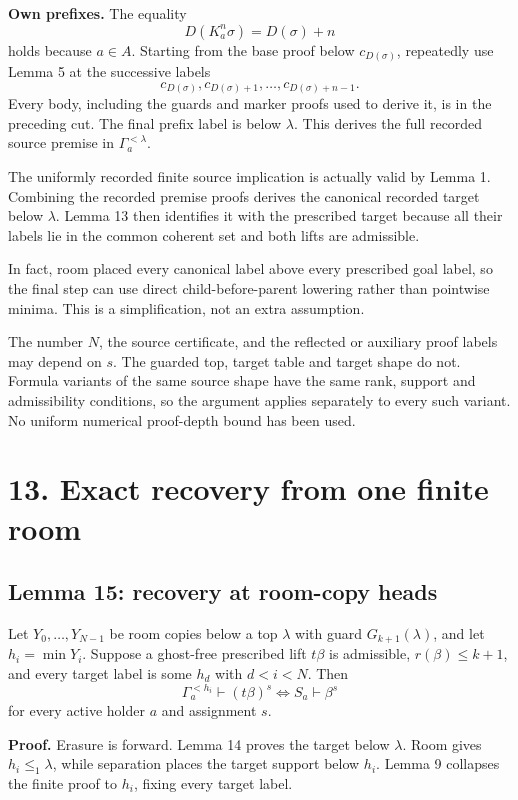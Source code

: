 \documentclass[
  11pt,
  letterpaper,
]{article}
\begin{document}
\textbf{Own prefixes.} The equality \[
D(K_a^n\sigma)=D(\sigma)+n
\] holds because \(a\in A\). Starting from the base proof below
\(c_{D(\sigma)}\), repeatedly use Lemma 5 at the successive labels \[
c_{D(\sigma)},c_{D(\sigma)+1},\ldots,
c_{D(\sigma)+n-1}.
\] Every body, including the guards and marker proofs used to derive it,
is in the preceding cut. The final prefix label is below \(\lambda\).
This derives the full recorded source premise in
\(\Gamma_a^{<\lambda}\).

The uniformly recorded finite source implication is actually valid by
Lemma 1. Combining the recorded premise proofs derives the canonical
recorded target below \(\lambda\). Lemma 13 then identifies it with the
prescribed target because all their labels lie in the common coherent
set and both lifts are admissible.

In fact, room placed every canonical label above every prescribed goal
label, so the final step can use direct child-before-parent lowering
rather than pointwise minima. This is a simplification, not an extra
assumption.

The number \(N\), the source certificate, and the reflected or auxiliary
proof labels may depend on \(s\). The guarded top, target table and
target shape do not. Formula variants of the same source shape have the
same rank, support and admissibility conditions, so the argument applies
separately to every such variant. No uniform numerical proof-depth bound
has been used.

\section{13. Exact recovery from one finite
room}\label{exact-recovery-from-one-finite-room}

\subsection{Lemma 15: recovery at room-copy
heads}\label{lemma-15-recovery-at-room-copy-heads}

Let \(Y_0,\ldots,Y_{N-1}\) be room copies below a top \(\lambda\) with
guard \(G_{k+1}(\lambda)\), and let \(h_i=\min Y_i\). Suppose a
ghost-free prescribed lift \(t\beta\) is admissible,
\(r(\beta)\leq k+1\), and every target label is some \(h_d\) with
\(d<i<N\). Then \[
\Gamma_a^{<h_i}\vdash(t\beta)^s
\iff S_a\vdash\beta^s
\] for every active holder \(a\) and assignment \(s\).

\textbf{Proof.} Erasure is forward. Lemma 14 proves the target below
\(\lambda\). Room gives \(h_i\leq_1\lambda\), while separation places
the target support below \(h_i\). Lemma 9 collapses the finite proof to
\(h_i\), fixing every target label.
\end{document}
